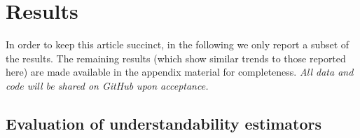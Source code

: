\documentclass[10pt,a4paper]{article}
\begin{document}
\section*{Results}


In order to keep this article  succinct, in the following we only report a subset of the results. The remaining results (which show similar trends to those reported here) are made available in the appendix material  for completeness.  \textit{All data and code will be shared on GitHub upon acceptance.}

\subsection*{Evaluation of understandability estimators}
\label{sec:beyond_readability}
\end{document}
